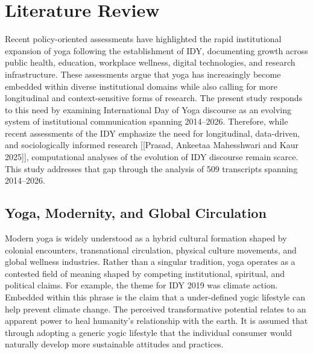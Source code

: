 \documentclass[11pt]{article}
\begin{document}
\section{Literature Review}


Recent policy-oriented assessments have highlighted the rapid institutional expansion of yoga following the establishment of
IDY, documenting growth across public health, education, workplace wellness, digital technologies, and research
infrastructure. These assessments argue that yoga has increasingly become embedded within diverse institutional domains while also
calling for more longitudinal and context-sensitive forms of research. The present study responds to this need by examining
International Day of Yoga discourse as an evolving system of institutional communication spanning 2014--2026.
Therefore, while recent assessments of the IDY emphasize the need for longitudinal, data-driven,
and sociologically informed research [[Prasad, Ankeetaa Mahesshwari and Kaur 2025]], computational analyses of the 
evolution of IDY discourse remain scarce. This study addresses that gap through the analysis of 509 transcripts spanning 2014–2026.




\subsection{Yoga, Modernity, and Global Circulation}


Modern yoga is widely understood as a hybrid cultural formation shaped by colonial encounters, transnational
circulation, physical culture movements, and global wellness industries. Rather than a singular tradition, yoga operates
as a contested field of meaning shaped by competing institutional, spiritual, and political claims. For example, the
theme for IDY 2019 was climate action. Embedded within this phrase is the claim that a under-defined yogic lifestyle can
help prevent climate change. The perceived transformative potential relates to an apparent power to heal humanity’s
relationship with the earth. It is assumed that through adopting a generic yogic lifestyle that the individual consumer
would naturally develop more sustainable attitudes and practices.
\end{document}
